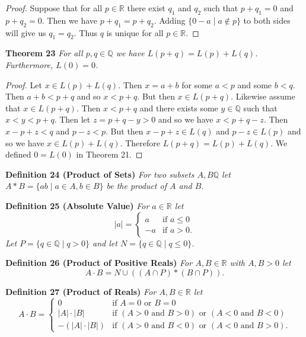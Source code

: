 \documentclass{article}
\begin{document}
\begin{flushleft}
\begin{proof}
Suppose that for all $p \in \mathbb{R}$ there exist $q_1$ and $q_2$ such that $p+q_1=0$ and $p+q_2=0$. Then we have $p+q_1=p+q_2$. Adding $\{0-a \mid a \notin p\}$ to both sides will give us $q_1=q_2$. Thus $q$ is unique for all $p \in \mathbb{R}$.
\end{proof}

\textbf{Theorem 23}
\textsl{For all $p,q \in \mathbb{Q}$ we have $L(p+q)=L(p)+L(q)$. Furthermore, $L(0)=0$.}
\begin{proof}
Let $x \in L(p)+L(q)$. Then $x=a+b$ for some $a < p$ and some $b < q$. Then $a+b < p+q$ and so $x<p+q$. But then $x \in L(p+q)$. Likewise assume that $x \in L(p+q)$. Then $x<p+q$ and there exists some $y \in \mathbb{Q}$ such that $x<y<p+q$. Then let $z = p+q-y>0$ and so we have $x<p+q-z$. Then $x-p+z<q$ and $p-z<p$. But then $x-p+z \in L(q)$ and $p-z \in L(p)$ and so we have $x \in L(p) + L(q)$. Therefore $L(p+q) = L(p) + L(q)$. We defined $0=L(0)$ in Theorem 21.
\end{proof}

\textbf{Definition 24 (Product of Sets)}
\textsl{For two subsets $A, B \mathbb{Q}$ let $A * B = \{ab \mid a \in A, b \in B\}$ be the product of $A$ and $B$.}
\newline

\textbf{Definition 25 (Absolute Value)}
\textsl{For $a \in \mathbb{R}$ let
\[
|a|=
\begin{cases}
a & \text{if } a \leq 0 \\
-a & \text{if } a >0.
\end{cases}
\]
Let $P=\{q \in \mathbb{Q} \mid q > 0\}$ and let $N=\{q \in \mathbb{Q} \mid q \leq 0\}$.}
\newline

\textbf{Definition 26 (Product of Positive Reals)}
\textsl{For $A, B \in \mathbb{R}$ with $A,B > 0$ let
\[
A \cdot B = N \cup ((A \cap P) * (B \cap P)).
\]}

\textbf{Definition 27 (Product of Reals)}
\textsl{For $A, B \in \mathbb{R}$ let
\[
A \cdot B=
\begin{cases}
0 & \text{if } A=0 \text{ or } B=0 \\
|A| \cdot |B| & \text{if } (A>0 \text{ and } B>0) \text{ or } (A<0 \text{ and } B<0) \\
-(|A| \cdot |B|) & \text{if } (A>0 \text{ and } B<0) \text{ or } (A<0 \text{ and } B>0).
\end{cases}
\]}
\newline


\end{flushleft}
\end{document}
